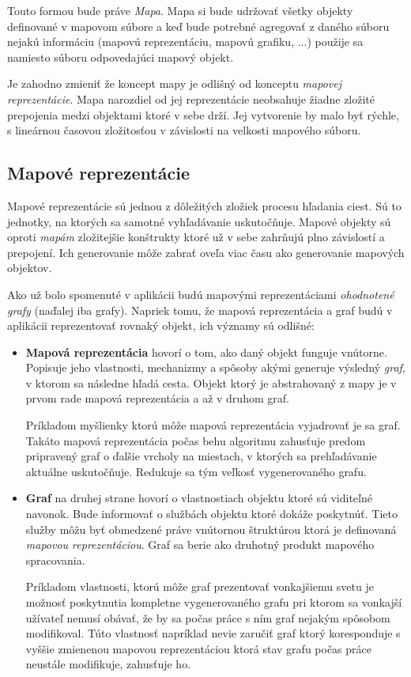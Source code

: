 Touto formou bude práve \textit{Mapa}. Mapa si bude udržovať všetky objekty definované v mapovom súbore a keď bude potrebné agregovať z daného súboru nejakú informáciu (mapovú reprezentáciu, mapovú grafiku, ...) použije sa namiesto súboru odpovedajúci mapový objekt.

Je zahodno zmieniť že koncept mapy je odlišný od konceptu \textit{mapovej reprezentácie}. Mapa narozdiel od jej reprezentácie neobsahuje žiadne zložité prepojenia medzi objektami ktoré v sebe drží. Jej vytvorenie by malo byť rýchle, s lineárnou časovou zložitosťou v závislosti na velkosti mapového súboru.

\subsection{Mapové reprezentácie}\label{mapove_reprezentacie}

Mapové reprezentácie sú jednou z dôležitých zložiek procesu hľadania ciest. Sú to jednotky, na ktorých sa samotné vyhľadávanie uskutočňuje. Mapové objekty sú oproti \textit{mapám} zložitejšie konštrukty ktoré už v sebe zahrňujú plno závislostí a prepojení. Ich generovanie môže zabrať oveľa viac času ako generovanie mapových objektov. 

Ako už bolo spomenuté v aplikácii budú mapovými reprezentáciami \textit{ohodnotené grafy} (naďalej iba grafy). Napriek tomu, že mapová reprezentácia a graf budú v aplikácii reprezentovať rovnaký objekt, ich významy sú odlišné:

\begin{itemize}
    \item \textbf{Mapová reprezentácia} hovorí o tom, ako daný objekt funguje vnútorne. Popisuje jeho vlastnosti, mechanizmy a spôsoby akými generuje výsledný \textit{graf}, v ktorom sa následne hľadá cesta. Objekt ktorý je abstrahovaný z mapy je v prvom rade mapová reprezentácia a až v druhom graf.
    
    Príkladom myšlienky ktorú môže mapová reprezentácia vyjadrovať je  sa graf. Takáto mapová reprezentácia počas behu algoritmu zahusťuje predom pripravený graf o ďalšie vrcholy na miestach, v ktorých sa prehľadávanie aktuálne uskutočňuje. Redukuje sa tým veľkosť vygenerovaného grafu.   
    \item\textbf{Graf} na druhej strane hovorí o vlastnostiach objektu ktoré sú viditeľné navonok. Bude informovať o  službách objektu ktoré dokáže poskytnúť. Tieto služby môžu byť obmedzené práve vnútornou štruktúrou ktorá je definovaná \textit{mapovou reprezentáciou}. Graf sa berie ako druhotný produkt mapového spracovania.   

    Príkladom vlastnosti, ktorú môže graf prezentovať vonkajšiemu svetu je možnosť poskytnutia kompletne vygenerovaného grafu pri ktorom sa vonkajší užívateľ nemusí obávať, že by sa počas práce s ním graf nejakým spôsobom modifikoval. Túto vlastnosť napríklad nevie zaručiť graf ktorý koresponduje s vyššie zmienenou mapovou reprezentáciou ktorá stav grafu počas práce neustále modifikuje, zahusťuje ho.
\end{itemize}

